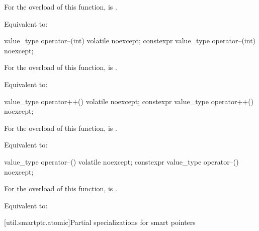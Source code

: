 \begin{itemdescr}
\pnum
\constraints
For the  overload of this function,
 is .

\pnum
\effects
Equivalent to: 
\end{itemdescr}

%
%
\begin{itemdecl}
value_type operator--(int) volatile noexcept;
constexpr value_type operator--(int) noexcept;
\end{itemdecl}

\begin{itemdescr}
\pnum
\constraints
For the  overload of this function,
 is .

\pnum
\effects
Equivalent to: 
\end{itemdescr}

%
%
\begin{itemdecl}
value_type operator++() volatile noexcept;
constexpr value_type operator++() noexcept;
\end{itemdecl}

\begin{itemdescr}
\pnum
\constraints
For the  overload of this function,
 is .

\pnum
\effects
Equivalent to: 
\end{itemdescr}

%
%
\begin{itemdecl}
value_type operator--() volatile noexcept;
constexpr value_type operator--() noexcept;
\end{itemdecl}

\begin{itemdescr}
\pnum
\constraints
For the  overload of this function,
 is .

\pnum
\effects
Equivalent to: 
\end{itemdescr}

[util.smartptr.atomic]{Partial specializations for smart pointers}%
%

